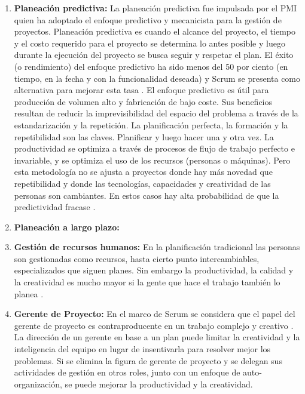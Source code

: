 \begin{enumerate}

\item \textbf{Planeación predictiva:} La planeación predictiva fue impulsada por el PMI quien ha adoptado el enfoque predictivo y mecanicista para la gestión de proyectos. Planeación predictiva es cuando el alcance del proyecto, el tiempo y el costo requerido para el proyecto se determina lo antes posible y luego durante la ejecución del proyecto se busca seguir y respetar el plan. El éxito (o rendimiento) del enfoque predictivo ha sido menos del 50 por ciento (en tiempo, en la fecha y con la funcionalidad deseada) y Scrum se presenta como alternativa para mejorar esta tasa \cite{Ken-Schwaber-2011}. El enfoque predictivo es útil para producción de volumen alto y fabricación de bajo coste. Sus beneficios resultan de reducir la imprevisibilidad del espacio del problema a través de la estandarización y la repetición. La planificación perfecta, la formación y la repetibilidad son las claves. Planificar y luego hacer una y otra vez. La productividad se optimiza a través de procesos de flujo de trabajo perfecto e invariable, y se optimiza el uso de los recursos (personas o máquinas). Pero esta metodología no se ajusta a proyectos donde hay más novedad que repetibilidad y donde las tecnologías, capacidades y creatividad de las personas son cambiantes. En estos casos hay alta probabilidad de que la predictividad fracase \cite{Ken-Schwaber-2011}.

\item \textbf{Planeación a largo plazo:}

\item \textbf{Gestión de recursos humanos:} En la planificación tradicional las personas son gestionadas como recursos, hasta cierto punto intercambiables, especializados que siguen planes. Sin embargo la productividad, la calidad y la creatividad es mucho mayor si la gente que hace el trabajo también lo planea \cite{Ken-Schwaber-2011}.

\item \textbf{Gerente de Proyecto:} En el marco de Scrum se considera que el papel del gerente de proyecto es contraproducente en un trabajo complejo y creativo \cite{Ken-Schwaber-2011}. La dirección de un gerente en base a un plan puede limitar la creatividad y la inteligencia del equipo en lugar de insentivarla para resolver mejor los problemas. Si se elimina la figura de gerente de proyecto y se delegan sus actividades de gestión en otros roles, junto con un enfoque de auto-organización, se puede mejorar la productividad y la creatividad.

\end{enumerate}


